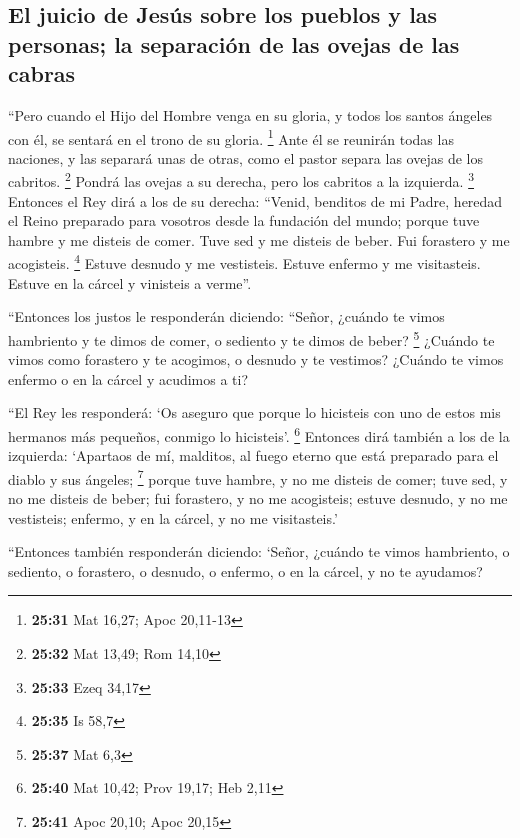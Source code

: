 \hypertarget{el-juicio-de-jesuxfas-sobre-los-pueblos-y-las-personas-la-separaciuxf3n-de-las-ovejas-de-las-cabras}{%
\subsection{El juicio de Jesús sobre los pueblos y las personas; la
separación de las ovejas de las
cabras}\label{el-juicio-de-jesuxfas-sobre-los-pueblos-y-las-personas-la-separaciuxf3n-de-las-ovejas-de-las-cabras}}

 ``Pero cuando el Hijo del Hombre venga en su gloria, y
todos los santos ángeles con él, se sentará en el trono de su gloria.
\footnote{\textbf{25:31} Mat 16,27; Apoc 20,11-13}  Ante
él se reunirán todas las naciones, y las separará unas de otras, como el
pastor separa las ovejas de los cabritos. \footnote{\textbf{25:32} Mat
  13,49; Rom 14,10}  Pondrá las ovejas a su derecha, pero
los cabritos a la izquierda. \footnote{\textbf{25:33} Ezeq 34,17}
 Entonces el Rey dirá a los de su derecha: ``Venid,
benditos de mi Padre, heredad el Reino preparado para vosotros desde la
fundación del mundo;  porque tuve hambre y me disteis de
comer. Tuve sed y me disteis de beber. Fui forastero y me acogisteis.
\footnote{\textbf{25:35} Is 58,7}  Estuve desnudo y me
vestisteis. Estuve enfermo y me visitasteis. Estuve en la cárcel y
vinisteis a verme''.

 ``Entonces los justos le responderán diciendo: ``Señor,
¿cuándo te vimos hambriento y te dimos de comer, o sediento y te dimos
de beber? \footnote{\textbf{25:37} Mat 6,3}  ¿Cuándo te
vimos como forastero y te acogimos, o desnudo y te vestimos?
 ¿Cuándo te vimos enfermo o en la cárcel y acudimos a ti?

 ``El Rey les responderá: `Os aseguro que porque lo
hicisteis con uno de estos mis hermanos más pequeños, conmigo lo
hicisteis'. \footnote{\textbf{25:40} Mat 10,42; Prov 19,17; Heb 2,11}
 Entonces dirá también a los de la izquierda: `Apartaos
de mí, malditos, al fuego eterno que está preparado para el diablo y sus
ángeles; \footnote{\textbf{25:41} Apoc 20,10; Apoc 20,15}
 porque tuve hambre, y no me disteis de comer; tuve sed,
y no me disteis de beber;  fui forastero, y no me
acogisteis; estuve desnudo, y no me vestisteis; enfermo, y en la cárcel,
y no me visitasteis.'

 ``Entonces también responderán diciendo: `Señor, ¿cuándo
te vimos hambriento, o sediento, o forastero, o desnudo, o enfermo, o en
la cárcel, y no te ayudamos?


